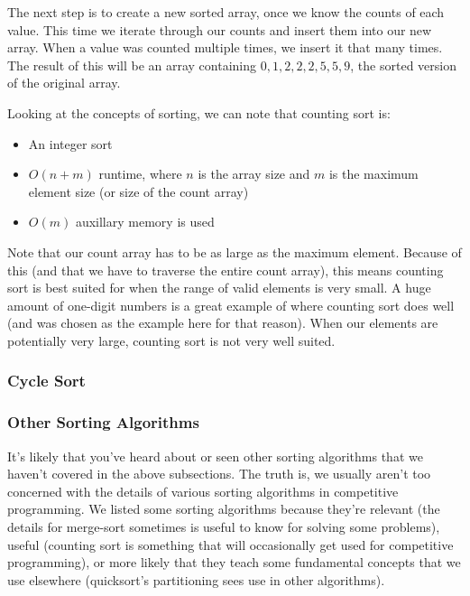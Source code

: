 The next step is to create a new sorted array, once we know the counts of each value. This time we iterate through our counts and insert them into our new array. When a value was counted multiple times, we insert it that many times. The result of this will be an array containing $0,1,2,2,2,5,5,9$, the sorted version of the original array.


Looking at the concepts of sorting, we can note that counting sort is:
\begin{itemize}
\item An integer sort
\item $O(n+m)$ runtime, where $n$ is the array size and $m$ is the maximum element size (or size of the count array)
\item $O(m)$ auxillary memory is used
\end{itemize}

Note that our count array has to be as large as the maximum element. Because of this (and that we have to traverse the entire count array), this means counting sort is best suited for when the range of valid elements is very small. A huge amount of one-digit numbers is a great example of where counting sort does well (and was chosen as the example here for that reason). When our elements are potentially very large, counting sort is not very well suited.

\subsubsection{Cycle Sort}

\subsubsection{Other Sorting Algorithms}

It's likely that you've heard about or seen other sorting algorithms that we haven't covered in the above subsections. The truth is, we usually aren't too concerned with the details of various sorting algorithms in competitive programming. We listed some sorting algorithms because they're relevant (the details for merge-sort sometimes is useful to know for solving some problems), useful (counting sort is something that will occasionally get used for competitive programming), or more likely that they teach some fundamental concepts that we use elsewhere (quicksort's partitioning sees use in other algorithms).

